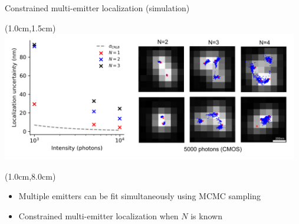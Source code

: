 \documentclass{beamer}					%
\begin{document}

\begin{frame}{Constrained multi-emitter localization (simulation)}

\begin{textblock*}{13cm}(1.0cm,1.5cm)
\includegraphics[width=13cm]{../../spad/spad/media/MultiEmitter.png}
\end{textblock*}

\begin{textblock*}{13cm}(1.0cm,8.0cm)
\begin{itemize}
\item Multiple emitters can be fit simultaneously using MCMC sampling
\item Constrained multi-emitter localization when $N$ is known
\end{itemize}
\end{textblock*}

\end{frame}
\end{document}
